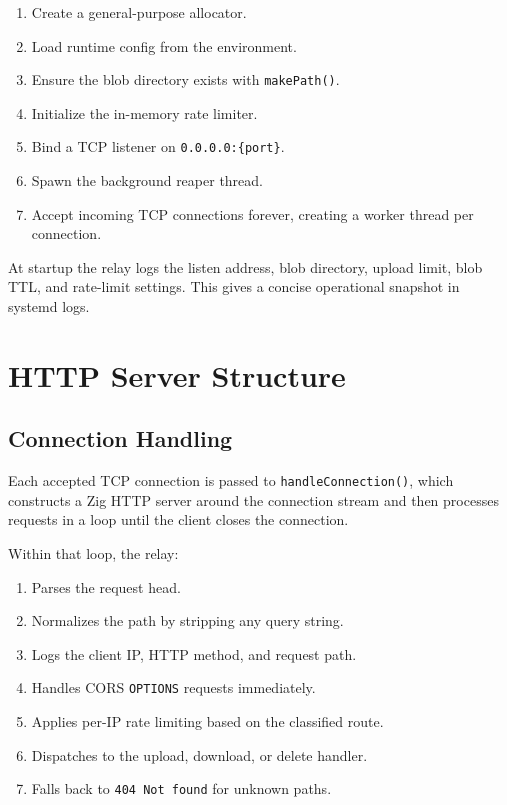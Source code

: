 \documentclass[11pt,a4paper]{report}
\begin{document}
\begin{enumerate}
    \item Create a general-purpose allocator.
    \item Load runtime config from the environment.
    \item Ensure the blob directory exists with \texttt{makePath()}.
    \item Initialize the in-memory rate limiter.
    \item Bind a TCP listener on \texttt{0.0.0.0:\{port\}}.
    \item Spawn the background reaper thread.
    \item Accept incoming TCP connections forever, creating a worker thread per connection.
\end{enumerate}

At startup the relay logs the listen address, blob directory, upload limit, blob TTL, and rate-limit settings. This gives a concise operational snapshot in systemd logs.

\chapter{HTTP Server Structure}

\section{Connection Handling}

Each accepted TCP connection is passed to \texttt{handleConnection()}, which constructs a Zig HTTP server around the connection stream and then processes requests in a loop until the client closes the connection.

Within that loop, the relay:

\begin{enumerate}
    \item Parses the request head.
    \item Normalizes the path by stripping any query string.
    \item Logs the client IP, HTTP method, and request path.
    \item Handles CORS \texttt{OPTIONS} requests immediately.
    \item Applies per-IP rate limiting based on the classified route.
    \item Dispatches to the upload, download, or delete handler.
    \item Falls back to \texttt{404 Not found} for unknown paths.
\end{enumerate}
\end{document}
